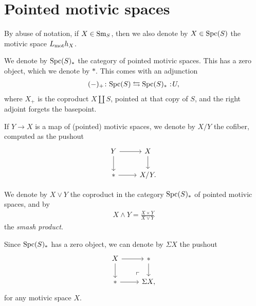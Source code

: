 \documentclass[11pt,openany]{book}
\let\smashprod\wedge
\begin{document}
\section{Pointed motivic spaces}

\begin{notation} By abuse of notation, if $X \in \mathrm{Sm}_S$, then we also denote by $X \in \mathrm{Spc}(S)$ the motivic space $L_{\mathrm{mot}} h_X$.
\end{notation}

\begin{notation} We denote by $\mathrm{Spc}(S)_\ast$ the category of pointed motivic spaces. This has a zero object, which we denote by $\ast$. This comes with an adjunction
\begin{align*}
    (-)_+ \colon \Spc(S) \leftrightarrows \Spc(S)_\ast \noloc U,
\end{align*}
where $X_+$ is the coproduct $X \amalg S$, pointed at that copy of $S$, and the right adjoint forgets the basepoint.
\end{notation}

\begin{notation} If $Y \to X$ is a map of (pointed) motivic spaces, we denote by $X/Y$ the cofiber, computed as the pushout
\[\begin{tikzcd}
    Y\rar\dar & X\dar\\
    \ast\rar & X/Y.
\end{tikzcd} \]
\end{notation}

We denote by $X \vee Y$ the coproduct in the category $\mathrm{Spc}(S)_\ast$ of pointed motivic spaces, and by
\begin{align*}
    X \smashprod Y = \frac{X \times Y}{X \vee Y}
\end{align*}
the \textit{smash product}.

\begin{notation} Since $\mathrm{Spc}(S)_\ast$ has a zero object, we can denote by $\Sigma X$ the pushout
\[\begin{tikzcd}
    X\rar\dar & \ast\dar\\
    \ast\rar & \Sigma X\po,
\end{tikzcd} \]
for any motivic space $X$.
\end{notation}
\end{document}

